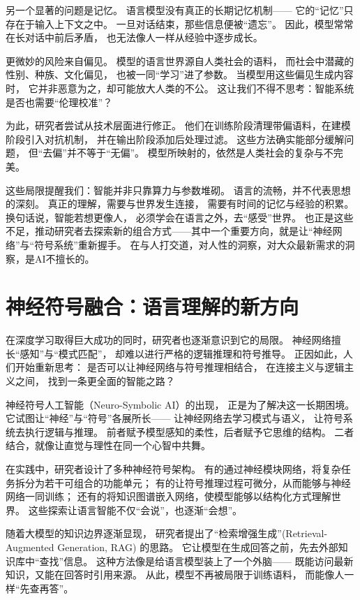 另一个显著的问题是记忆。  
语言模型没有真正的长期记忆机制——  
它的“记忆”只存在于输入上下文之中。  
一旦对话结束，那些信息便被“遗忘”。  
因此，模型常常在长对话中前后矛盾，  
也无法像人一样从经验中逐步成长。  

更微妙的风险来自偏见。  
模型的语言世界源自人类社会的语料，  
而社会中潜藏的性别、种族、文化偏见，  
也被一同“学习”进了参数。  
当模型用这些偏见生成内容时，  
它并非恶意为之，却可能放大人类的不公。  
这让我们不得不思考：智能系统是否也需要“伦理校准”？  

为此，研究者尝试从技术层面进行修正。  
他们在训练阶段清理带偏语料，在建模阶段引入对抗机制，  
并在输出阶段添加后处理过滤。  
这些方法确实能部分缓解问题，  
但“去偏”并不等于“无偏”。  
模型所映射的，依然是人类社会的复杂与不完美。  

这些局限提醒我们：智能并非只靠算力与参数堆砌。  
语言的流畅，并不代表思想的深刻。  
真正的理解，需要与世界发生连接，  
需要有时间的记忆与经验的积累。  
换句话说，智能若想更像人，  
必须学会在语言之外，去“感受”世界。 
也正是这些不足，推动研究者去探索新的组合方式——其中一个重要方向，就是让“神经网络”与“符号系统”重新握手。
在与人打交道，对人性的洞察，对大众最新需求的洞察，是AI不擅长的。 
 

\section{神经符号融合：语言理解的新方向}

在深度学习取得巨大成功的同时，研究者也逐渐意识到它的局限。  
神经网络擅长“感知”与“模式匹配”，  
却难以进行严格的逻辑推理和符号推导。  
正因如此，人们开始重新思考：  
是否可以让神经网络与符号推理相结合，  
在连接主义与逻辑主义之间，  
找到一条更全面的智能之路？  

神经符号人工智能（Neuro-Symbolic AI）的出现，  
正是为了解决这一长期困境。  
它试图让“神经”与“符号”各展所长——  
让神经网络去学习模式与语义，  
让符号系统去执行逻辑与推理。  
前者赋予模型感知的柔性，后者赋予它思维的结构。  
二者结合，就像让直觉与理性在同一个心智中共舞。  

在实践中，研究者设计了多种神经符号架构。  
有的通过神经模块网络，将复杂任务拆分为若干可组合的功能单元；  
有的让符号推理过程可微分，从而能够与神经网络一同训练；  
还有的将知识图谱嵌入网络，使模型能够以结构化方式理解世界。  
这些探索让语言智能不仅“会说”，也逐渐“会想”。  

随着大模型的知识边界逐渐显现，  
研究者提出了“检索增强生成”(Retrieval-Augmented Generation, RAG) 的思路。  
它让模型在生成回答之前，先去外部知识库中“查找”信息。  
这种方法像是给语言模型装上了一个外脑——  
既能访问最新知识，又能在回答时引用来源。  
从此，模型不再被局限于训练语料，  
而能像人一样“先查再答”。  

